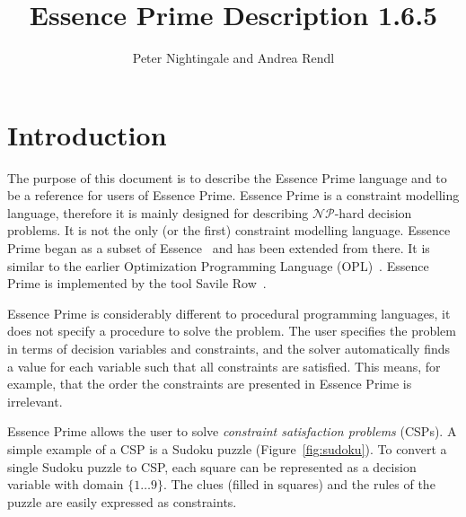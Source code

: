 \documentclass[a4paper]{article}
\newcommand{\eprime}{{\sc Essence Prime}\xspace}
\newcommand{\essence}{{\sc Essence}\xspace}
\newcommand{\savilerow}{{\sc Savile Row}\xspace}
\newcommand{\version}{1.6.5\xspace}
\begin{document}
\title{\eprime Description \version}

\author{Peter Nightingale and Andrea Rendl}

\date{}

\maketitle

\section{Introduction}

The purpose of this document is to describe the \eprime language and to be a 
reference for users of \eprime.  \eprime is a constraint modelling language,
therefore it is mainly designed for describing $\mathcal{NP}$-hard decision 
problems. It is not the only (or the first) constraint modelling language. 
\eprime began as a subset of \essence~\cite{essence-journal-08} and has been extended
from there. It is similar to the earlier Optimization Programming Language (OPL)~\cite{opl-book}.
\eprime is implemented by the tool \savilerow~\cite{nightingale2014automatically, nightingale2015automatically}.

\eprime is considerably different to procedural programming languages, it does not specify a procedure
to solve the problem. The user specifies the problem in terms of decision variables
and constraints, and the solver automatically finds a value for each variable 
such that all constraints are satisfied. This means, for example, that the 
order the constraints are presented in \eprime is irrelevant. 

\eprime allows the user to solve \textit{constraint satisfaction problems} (CSPs). 
A simple example of a CSP is a Sudoku puzzle (Figure~\ref{fig:sudoku}). To convert
a single Sudoku puzzle to CSP, each square can be represented as a decision
variable with domain $\{1\ldots 9\}$. The clues (filled in squares) and the rules of the puzzle are
easily expressed as constraints. 
\end{document}
